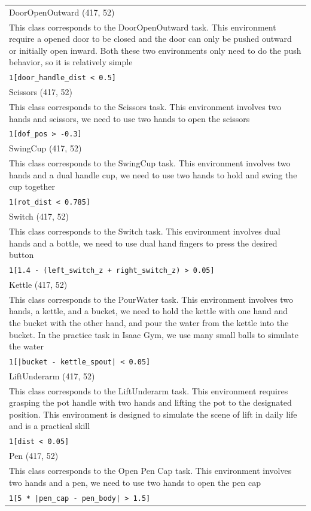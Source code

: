 \begin{tabularx}{\textwidth}{X}
    \hline
    DoorOpenOutward (417, 52) \\ This class corresponds to the DoorOpenOutward task. This environment require a opened door  to be closed and the door can only be pushed outward or initially open inward. Both these two  environments only need to do the push behavior, so it is relatively simple \\ \verb|1[door_handle_dist < 0.5]| \\[1px]
    \hline
    Scissors (417, 52) \\ This class corresponds to the Scissors task. This environment involves two hands and scissors,  we need to use two hands to open the scissors \\ \verb|1[dof_pos > -0.3]| \\[1px]
    \hline
    SwingCup (417, 52) \\ This class corresponds to the SwingCup task. This environment involves two hands and a dual handle cup, we need to use two hands to hold and swing the cup together \\ \verb|1[rot_dist < 0.785]| \\[1px]
    \hline
    Switch (417, 52) \\ This class corresponds to the Switch task. This environment involves dual hands and a bottle, we need to use dual hand fingers to press the desired button \\ \verb|1[1.4 - (left_switch_z + right_switch_z) > 0.05]| \\[1px]
    \hline
    Kettle (417, 52) \\ This class corresponds to the PourWater task. This environment involves two hands, a kettle, and a bucket, we need to hold the kettle with one hand and the bucket with the other hand, and pour the water from the kettle into the bucket. In the practice task in Isaac Gym, we use many small balls to simulate the water \\ \verb+1[|bucket - kettle_spout| < 0.05]+ \\[1px]
    \hline
    LiftUnderarm (417, 52) \\ This class corresponds to the LiftUnderarm task. This environment requires grasping the pot handle  with two hands and lifting the pot to the designated position. This environment is designed to simulate the scene of lift in daily life and is a practical skill \\ \verb|1[dist < 0.05]| \\[1px]
    \hline
    Pen (417, 52) \\ This class corresponds to the Open Pen Cap task. This environment involves two hands and a pen, we need to use two hands to open the pen cap \\ \verb+1[5 * |pen_cap - pen_body| > 1.5]+ \\[1px]

\end{tabularx}
